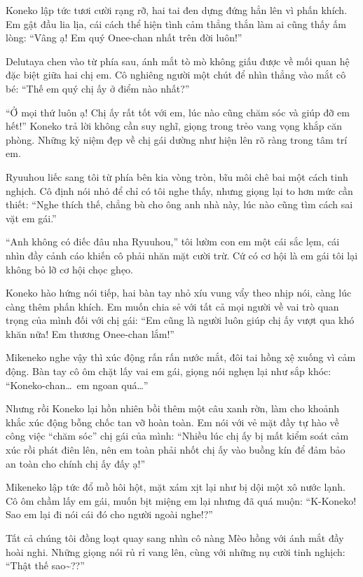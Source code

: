 ﻿\documentclass[../main.tex]{subfiles}
\begin{document}
Koneko lập tức tươi cười rạng rỡ, hai tai đen dựng đứng hẳn lên vì phấn khích. Em gật đầu lia lịa, cái cách thể hiện tình cảm thẳng thắn làm ai cũng thấy ấm lòng: ``Vâng ạ! Em quý Onee-chan nhất trên đời luôn!''

Delutaya chen vào từ phía sau, ánh mắt tò mò không giấu được về mối quan hệ đặc biệt giữa hai chị em. Cô nghiêng người một chút để nhìn thẳng vào mắt cô bé: ``Thế em quý chị ấy ở điểm nào nhất?''

``Ở mọi thứ luôn ạ! Chị ấy rất tốt với em, lúc nào cũng chăm sóc và giúp đỡ em hết!'' Koneko trả lời không cần suy nghĩ, giọng trong trẻo vang vọng khắp căn phòng. Những kỷ niệm đẹp về chị gái dường như hiện lên rõ ràng trong tâm trí em.

Ryuuhou liếc sang tôi từ phía bên kia vòng tròn, bĩu môi chê bai một cách tinh nghịch. Cô định nói nhỏ để chỉ có tôi nghe thấy, nhưng giọng lại to hơn mức cần thiết: ``Nghe thích thế, chẳng bù cho ông anh nhà này, lúc nào cũng tìm cách sai vặt em gái.''

``Anh không có điếc đâu nha Ryuuhou,'' tôi lườm con em một cái sắc lẹm, cái nhìn đầy cảnh cáo khiến cô phải nhăn mặt cười trừ. Cứ có cơ hội là em gái tôi lại không bỏ lỡ cơ hội chọc ghẹo.

Koneko hào hứng nói tiếp, hai bàn tay nhỏ xíu vung vẩy theo nhịp nói, càng lúc càng thêm phấn khích. Em muốn chia sẻ với tất cả mọi người về vai trò quan trọng của mình đối với chị gái: ``Em cũng là người luôn giúp chị ấy vượt qua khó khăn nữa! Em thương Onee-chan lắm!''

Mikeneko nghe vậy thì xúc động rấn rấn nước mắt, đôi tai hồng xệ xuống vì cảm động. Bàn tay cô ôm chặt lấy vai em gái, giọng nói nghẹn lại như sắp khóc: ``Koneko-chan\dots\ em ngoan quá\dots''

Nhưng rồi Koneko lại hồn nhiên bồi thêm một câu xanh rờn, làm cho khoảnh khắc xúc động bỗng chốc tan vỡ hoàn toàn. Em nói với vẻ mặt đầy tự hào về công việc ``chăm sóc'' chị gái của mình: ``Nhiều lúc chị ấy bị mất kiểm soát cảm xúc rồi phát điên lên, nên em toàn phải nhốt chị ấy vào buồng kín để đảm bảo an toàn cho chính chị ấy đấy ạ!''

Mikeneko lập tức đổ mồ hôi hột, mặt xám xịt lại như bị dội một xô nước lạnh. Cô ôm chầm lấy em gái, muốn bịt miệng em lại nhưng đã quá muộn: ``K-Koneko! Sao em lại đi nói cái đó cho người ngoài nghe!?''

Tất cả chúng tôi đồng loạt quay sang nhìn cô nàng Mèo hồng với ánh mắt đầy hoài nghi. Những giọng nói rủ rỉ vang lên, cùng với những nụ cười tinh nghịch: ``Thật thế sao\~{}??''
\end{document}
